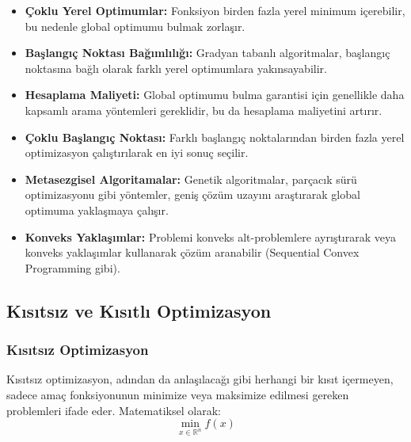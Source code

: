 \begin{itemize}
    \item \textbf{Çoklu Yerel Optimumlar:} Fonksiyon birden fazla yerel minimum içerebilir, bu nedenle global optimumu bulmak zorlaşır.
    \item \textbf{Başlangıç Noktası Bağımlılığı:} Gradyan tabanlı algoritmalar, başlangıç noktasına bağlı olarak farklı yerel optimumlara yakınsayabilir.
    \item \textbf{Hesaplama Maliyeti:} Global optimumu bulma garantisi için genellikle daha kapsamlı arama yöntemleri gereklidir, bu da hesaplama maliyetini artırır.
\end{itemize}


\begin{tcolorbox}[title=Konveks Olmayan Problemlere Yaklaşımlar]
\begin{itemize}
    \item \textbf{Çoklu Başlangıç Noktası:} Farklı başlangıç noktalarından birden fazla yerel optimizasyon çalıştırılarak en iyi sonuç seçilir.
    \item \textbf{Metasezgisel Algoritamalar:} Genetik algoritmalar, parçacık sürü optimizasyonu gibi yöntemler, geniş çözüm uzayını araştırarak global optimuma yaklaşmaya çalışır.
    \item \textbf{Konveks Yaklaşımlar:} Problemi konveks alt-problemlere ayrıştırarak veya konveks yaklaşımlar kullanarak çözüm aranabilir (Sequential Convex Programming gibi).
\end{itemize}
\end{tcolorbox}


\subsection{Kısıtsız ve Kısıtlı Optimizasyon}

\subsubsection{Kısıtsız Optimizasyon}
Kısıtsız optimizasyon, adından da anlaşılacağı gibi herhangi bir kısıt içermeyen, sadece amaç fonksiyonunun minimize veya maksimize edilmesi gereken problemleri ifade eder. Matematiksel olarak:
\begin{equation}
\min_{x \in \mathbb{R}^n} f(x)
\end{equation}


